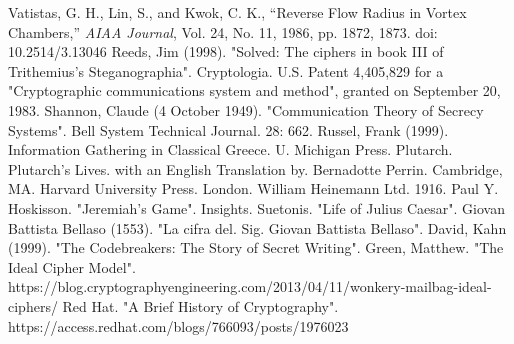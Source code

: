 \documentclass{AIAA}
\begin{document}
\begin{thebibliography}{}
 Vatistas, G. H., Lin, S., and Kwok, C. K., ``Reverse Flow Radius in Vortex Chambers,'' \textit{AIAA Journal}, Vol. 24, No. 11, 1986, pp. 1872, 1873. doi: 10.2514/3.13046
 Reeds, Jim (1998). "Solved: The ciphers in book III of Trithemius's Steganographia". Cryptologia.
 U.S. Patent 4,405,829 for a "Cryptographic communications system and method", granted on September 20, 1983. 
 Shannon, Claude (4 October 1949). "Communication Theory of Secrecy Systems". Bell System Technical Journal. 28: 662.
 Russel, Frank (1999). Information Gathering in Classical Greece. U. Michigan Press.
 Plutarch. Plutarch's Lives. with an English Translation by. Bernadotte Perrin. Cambridge, MA. Harvard University Press. London. William Heinemann Ltd. 1916.
 Paul Y. Hoskisson. "Jeremiah's Game". Insights.
 Suetonis. "Life of Julius Caesar".
 Giovan Battista Bellaso (1553).  "La cifra del. Sig. Giovan Battista Bellaso".
 David, Kahn (1999). "The Codebreakers: The Story of Secret Writing".
 Green, Matthew. "The Ideal Cipher Model". https://blog.cryptographyengineering.com/2013/04/11/wonkery-mailbag-ideal-ciphers/
 Red Hat. "A Brief History of Cryptography". https://access.redhat.com/blogs/766093/posts/1976023

\end{thebibliography}
\end{document}
